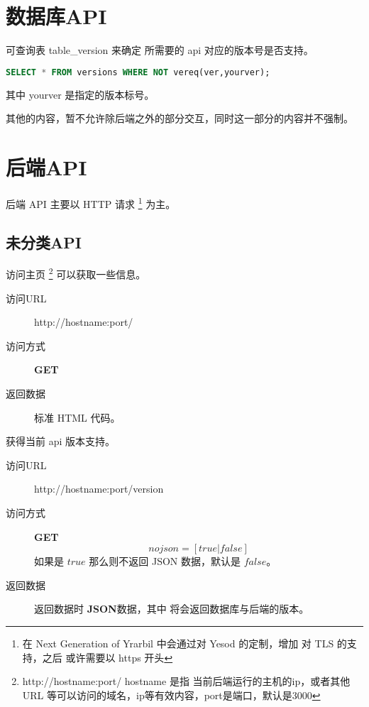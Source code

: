\documentclass[UTF8]{article}
\def\GET{\colorbox[rgb]{0.77,0.53,0.97}{\textbf{GET}}}
\def\bfJSON{\textbf{JSON}\space}
\def\viaurl{\item[{\quad\colorbox[rgb]{0.47,0.88,0.89}{访问URL}}]}
\def\viareq#1{\item[{\quad\colorbox[rgb]{0.57,0.88,0.99}{访问方式}}] #1}
\def\rtdata{\item[{\quad\colorbox[rgb]{0.70,0.9,0.59}{返回数据}}]}
\begin{document}
    \section{数据库API}
    可查询表 table\_version 来确定 所需要的 api 对应的版本号是否支持。
    \begin{lstlisting}[language=SQL]
SELECT * FROM versions WHERE NOT vereq(ver,yourver);
    \end{lstlisting}
    其中 yourver 是指定的版本标号。
    \par 其他的内容，暂不允许除后端之外的部分交互，同时这一部分的内容并不强制。




















    \section{后端API}
    后端 API 主要以 HTTP 请求
    \footnote{在 Next Generation of Yrarbil 中会通过对 Yesod 的定制，增加 对 TLS 的支持，之后 或许需要以 https 开头}
    为主。


    \subsection{未分类API}

    访问主页
    \footnote{ http://hostname:port/ hostname 是指 当前后端运行的主机的ip，或者其他URL 等可以访问的域名，ip等有效内容，port是端口，默认是3000}
    可以获取一些信息。
    \begin{description}
        \viaurl http://hostname:port/
        \viareq{\GET}
        \rtdata 标准 HTML 代码。
    \end{description}

    获得当前 api 版本支持。
    \begin{description}
		\viaurl http://hostname:port/version
		\viareq{\GET}
		$$nojson=[true|false]$$
		如果是 $true$ 那么则不返回 JSON 数据，默认是 $false$。
        \rtdata 返回数据时 \bfJSON 数据，其中 将会返回数据库与后端的版本。
	\end{description}
\end{document}

